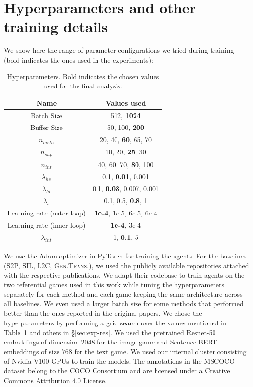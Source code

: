 \documentclass{article}
\newcommand{\ltc}{\textsc{L2C\xspace}}
\newcommand{\stp}{\textsc{S2P\xspace}}
\newcommand{\gentrans}{\textsc{Gen.Trans.\xspace}}
\newcommand{\sil}{\textsc{SIL\xspace}}
\begin{document}
\section{Hyperparameters and other training details}
We show here the range of parameter configurations we tried during training (bold indicates the ones used in the experiments):
\begin{table}
    \centering
    \begin{tabular}{c|c}
        Name & Values used \\
        \toprule
        Batch Size & 512, \textbf{1024} \\
        Buffer Size & 50, 100, \textbf{200} \\
        $n_{meta}$ & 20, 40, \textbf{60}, 65, 70 \\
        $n_{sup}$ & 10, 20, \textbf{25}, 30 \\
        $n_{int}$ & 40, 60, 70, \textbf{80}, 100 \\
        $\lambda_{hs}$ & 0.1, \textbf{0.01}, 0.001 \\
        $\lambda_{hl}$ & 0.1, \textbf{0.03}, 0.007, 0.001 \\
        $\lambda_{s}$ & 0.1, 0.5, \textbf{0.8}, 1 \\
        Learning rate (outer loop) & \textbf{1e-4}, 1e-5, 6e-5, 6e-4 \\
        Learning rate (inner loop) & \textbf{1e-4}, 3e-4 \\
        $\lambda_{int}$ & 1, \textbf{0.1}, 5 \\
    \end{tabular}
    \caption{Hyperparameters. Bold indicates the chosen values used for the final analysis.}
    \label{tab:hyperparams}
\end{table}
We use the Adam optimizer \citep{DBLP:journals/corr/KingmaB14} in PyTorch \citep{pytorch_NIPS2019} for training the agents. For the baselines (\stp, \sil, \ltc, \gentrans), we used the publicly available repositories attached with the respective publications. We adapt their codebase to train agents on the two referential games used in this work while tuning the hyperparameters separately for each method and each game keeping the same architecture across all baselines. We even used a larger batch size for some methods that performed better than the ones reported in the original papers. We chose the hyperparameters by performing a grid search over the values mentioned in Table~\ref{tab:hyperparams} and others in \S\ref{sec:exp-res}. We used the pretrained Resnet-50 embeddings of dimension $2048$ for the image game and Sentence-BERT embeddings of size $768$ for the text game. We used our internal cluster consisting of Nvidia V100 GPUs to train the models. The annotations in the MSCOCO dataset belong to the COCO Consortium and are licensed under a Creative Commons Attribution 4.0 License.
\end{document}
